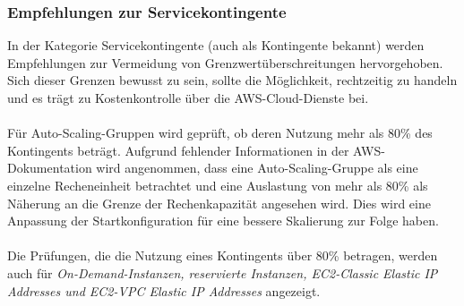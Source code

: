 \subsubsection*{Empfehlungen zur Servicekontingente}
In der Kategorie Servicekontingente (auch als Kontingente bekannt) werden Empfehlungen zur Vermeidung von Grenzwertüberschreitungen hervorgehoben. Sich dieser Grenzen bewusst zu sein, sollte die Möglichkeit, rechtzeitig zu handeln und es trägt zu Kostenkontrolle über die AWS-Cloud-Dienste bei.
\\\\
Für Auto-Scaling-Gruppen %
wird geprüft, ob deren Nutzung mehr als 80\% des Kontingents beträgt. Aufgrund fehlender Informationen in der AWS-Dokumentation wird angenommen, dass eine Auto-Scaling-Gruppe als eine einzelne Recheneinheit betrachtet und eine Auslastung von mehr als 80\% als Näherung an die Grenze der Rechenkapazität angesehen wird.
Dies wird eine Anpassung der Startkonfiguration für eine bessere Skalierung zur Folge haben. %
\\\\
Die Prüfungen, die die Nutzung eines Kontingents über 80\% betragen, werden auch für \textit{On-Demand-Instanzen, reservierte Instanzen, EC2-Classic Elastic IP Addresses und EC2-VPC Elastic IP Addresses} angezeigt.


